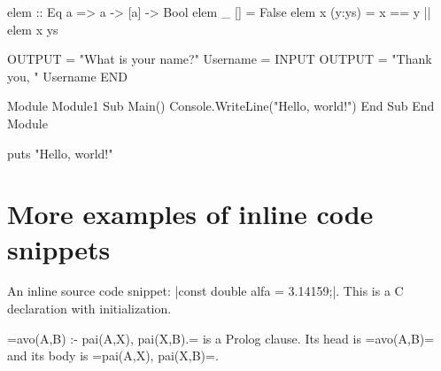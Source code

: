 \documentclass[10pt,a4paper]{article}
\begin{document}
\begin{Example}
\begin{pygmented}[colback=blue!20, boxing method=tcolorbox]
elem :: Eq a => a -> [a] -> Bool
elem _ [] = False
elem x (y:ys) = x == y || elem x ys
\end{pygmented}
\end{Example}

\begin{Example}

\begin{pygmented}[]
          OUTPUT = "What is your name?"
          Username = INPUT
          OUTPUT = "Thank you, " Username
END
\end{pygmented}
\end{Example}

\begin{Example}

\begin{pygmented}[test, lang=vbnet]
Module Module1
    Sub Main() 
        Console.WriteLine("Hello, world!")
    End Sub
End Module
\end{pygmented}
\end{Example}

\begin{Example}
\begin{pygmented}[lang=tcl]
puts "Hello, world!"
\end{pygmented}
\end{Example}

\section{More examples of inline code snippets}

\begin{Example}
  An inline source code snippet:
  \pyginline[lang=c]|const double alfa = 3.14159;|.
  This is a C declaration with initialization.
\end{Example}

\begin{Example}
  \pyginline[lang=prolog,colback=yellow]=avo(A,B) :- pai(A,X), pai(X,B).=
  is a Prolog clause. Its head is
  \pyginline[lang=prolog,sty=emacs,colback=yellow,linecolor=red]=avo(A,B)=
  and its body is
  \pyginline[lang=prolog,sty=vim,colback=black,hidealllines]=pai(A,X), pai(X,B)=.
\end{Example}
\end{document}
